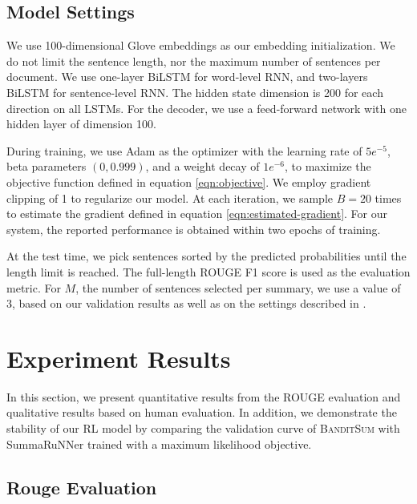 \documentclass[11pt,a4paper]{article}
\newcommand{\B}{\textsc{BanditSum }}
\begin{document}
\subsection{Model Settings}
We use 100-dimensional Glove embeddings \citep{we2_pennington2014glove} as our embedding initialization. We do not limit the sentence length, nor the maximum number of sentences per document. We use one-layer BiLSTM for word-level RNN, and two-layers BiLSTM for sentence-level RNN. The hidden state dimension is 200 for each direction on all LSTMs. For the decoder, we use a feed-forward network with one hidden layer of  dimension 100. 


During training, we use Adam \citep{adam_kingma2014adam} as the optimizer with the learning rate of $5e^{-5}$, beta parameters $(0, 0.999)$, and a weight decay of $1e^{-6}$, to maximize the objective function defined in equation \eqref{eqn:objective}. We employ gradient clipping of 1 to regularize our model. At each iteration, we sample $B = 20$ times to estimate the gradient defined in equation \ref{eqn:estimated-gradient}. For our system, the reported performance is obtained within two epochs of training.



At the test time, we pick sentences sorted by the predicted probabilities until the length limit is reached. The full-length ROUGE F1 score is used as the evaluation metric. For $M$, the number of sentences selected per summary, we use a value of 3, based on our validation results as well as on the settings described in \citet{ext5_summarunner}.

\section{Experiment Results\label{sec:results}}
In this section, we present  quantitative results from the ROUGE evaluation and qualitative results based on human evaluation. In addition, we demonstrate the stability of our RL model by comparing the validation curve of \B with SummaRuNNer \citep{ext5_summarunner} trained with a maximum likelihood objective. 
\subsection{Rouge Evaluation}
\end{document}
